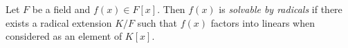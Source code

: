 \documentclass[12pt]{article}
\begin{document}
Let $F$ be a field and $f(x) \in F[x]$.  Then $f(x)$ is \emph{solvable by radicals} if there exists a radical extension $K/F$ such that $f(x)$ factors into linears when considered as an element of $K[x]$.
\end{document}
